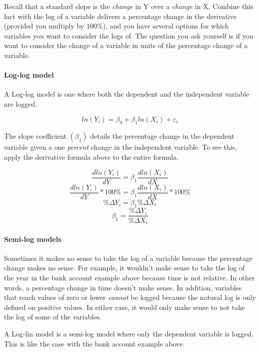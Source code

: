\documentclass[
]{book}
\begin{document}
Recall that a standard slope is the \emph{change} in Y over a \emph{change} in X. Combine this fact with the log of a variable delivers a percentage change in the derivative (provided you multiply by \(100\%\)), and you have several options for which variables you want to consider the logs of. The question you ask yourself is if you want to consider the change of a variable in units of the percentage change of a variable.

\hypertarget{log-log-model}{%
\paragraph*{Log-log model}\label{log-log-model}}

A Log-log model is one where both the dependent and the independent variable are logged.

\[ln(Y_i)=\beta_0 + \beta_1 ln(X_i) + \varepsilon_i\]

The slope coefficient \((\beta_1)\) details the percentage change in the dependent variable given a one \emph{percent} change in the independent variable. To see this, apply the derivative formula above to the entire formula.

\[\frac{dln(Y_i)}{dY} = \beta_1 \frac{dln(X_i)}{dX}\]
\[\frac{dln(Y_i)}{dY} * 100\% = \beta_1 \frac{dln(X_i)}{dX} * 100\%\]
\[\%\Delta Y_i = \beta_1 \%\Delta X_i\]
\[ \beta_1 =\frac{\%\Delta Y_i}{\%\Delta X_i}\]

\hypertarget{semi-log-models}{%
\paragraph*{Semi-log models}\label{semi-log-models}}

Sometimes it makes no sense to take the log of a variable because the percentage change makes no sense. For example, it wouldn't make sense to take the log of the year in the bank account example above because time is not relative. In other words, a percentage change in time doesn't make sense. In addition, variables that reach values of zero or lower \emph{cannot} be logged because the natural log is only defined on positive values. In either case, it would only make sense to not take the log of some of the variables.

A Log-lin model is a semi-log model where only the dependent variable is logged. This is like the case with the bank account example above.
\end{document}
